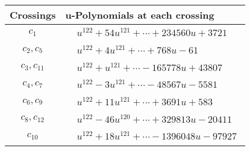 \documentclass[1p]{elsarticle_modified}
\theoremstyle{definition}
\begin{document}
\begin{tabular}{m{50pt}|m{274pt}}
Crossings & \hspace{64pt}u-Polynomials at each crossing \\
\hline $$\begin{aligned}c_{1}\end{aligned}$$&$\begin{aligned}
&u^{122}+54 u^{121}+\cdots+234560 u+3721
\end{aligned}$\\
\hline $$\begin{aligned}c_{2},c_{5}\end{aligned}$$&$\begin{aligned}
&u^{122}+4 u^{121}+\cdots+768 u-61
\end{aligned}$\\
\hline $$\begin{aligned}c_{3},c_{11}\end{aligned}$$&$\begin{aligned}
&u^{122}+u^{121}+\cdots-165778 u+43807
\end{aligned}$\\
\hline $$\begin{aligned}c_{4},c_{7}\end{aligned}$$&$\begin{aligned}
&u^{122}-3 u^{121}+\cdots-48567 u-5581
\end{aligned}$\\
\hline $$\begin{aligned}c_{6},c_{9}\end{aligned}$$&$\begin{aligned}
&u^{122}+11 u^{121}+\cdots+3691 u+583
\end{aligned}$\\
\hline $$\begin{aligned}c_{8},c_{12}\end{aligned}$$&$\begin{aligned}
&u^{122}-46 u^{120}+\cdots+329813 u-20411
\end{aligned}$\\
\hline $$\begin{aligned}c_{10}\end{aligned}$$&$\begin{aligned}
&u^{122}+18 u^{121}+\cdots-1396048 u-97927
\end{aligned}$\\
\hline
\end{tabular}\\~\\
\end{document}
